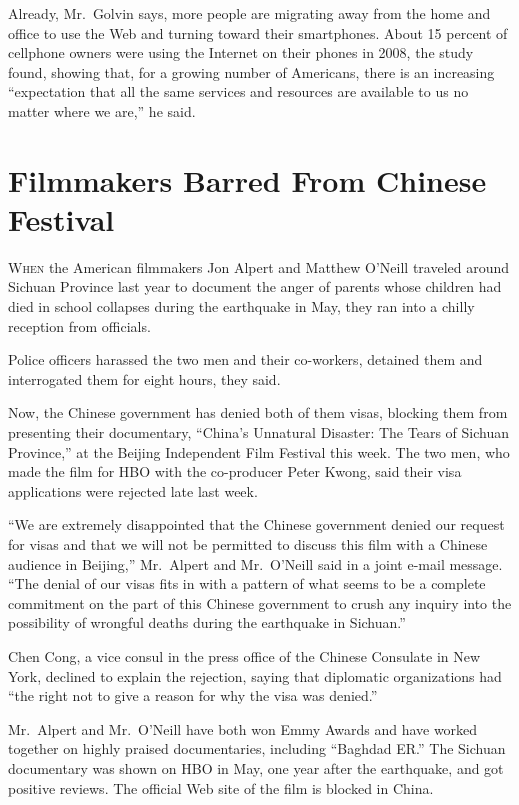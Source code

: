﻿\documentclass[12pt]{article}
\begin{document}
Already, Mr.~Golvin says, more people are migrating away from the home and office to use the Web and
turning toward their smartphones. About 15 percent of cellphone owners were using the Internet on
their phones in 2008, the study found, showing that, for a growing number of Americans, there is an
increasing ``expectation that all the same services and resources are available to us no matter
where we are,'' he said.

\section{Filmmakers Barred From Chinese Festival}

\lettrine{W}{hen} the American filmmakers Jon Alpert and Matthew O'Neill traveled around Sichuan
Province last year to document the anger of parents whose children had died in school collapses
during the earthquake in May, they ran into a chilly reception from officials.

Police officers harassed the two men and their co-workers, detained them and interrogated them for
eight hours, they said.

Now, the Chinese government has denied both of them visas, blocking them from presenting their
documentary, ``China's Unnatural Disaster: The Tears of Sichuan Province,'' at the Beijing
Independent Film Festival this week. The two men, who made the film for HBO with the co-producer
Peter Kwong, said their visa applications were rejected late last week.

``We are extremely disappointed that the Chinese government denied our request for visas and that we
will not be permitted to discuss this film with a Chinese audience in Beijing,'' Mr.~Alpert and
Mr.~O'Neill said in a joint e-mail message. ``The denial of our visas fits in with a pattern of what
seems to be a complete commitment on the part of this Chinese government to crush any inquiry into
the possibility of wrongful deaths during the earthquake in Sichuan.''

Chen Cong, a vice consul in the press office of the Chinese Consulate in New York, declined to
explain the rejection, saying that diplomatic organizations had ``the right not to give a reason for
why the visa was denied.''

Mr.~Alpert and Mr.~O'Neill have both won Emmy Awards and have worked together on highly praised
documentaries, including ``Baghdad ER.'' The Sichuan documentary was shown on HBO in May, one year
after the earthquake, and got positive reviews. The official Web site of the film is blocked in
China.
\end{document}
